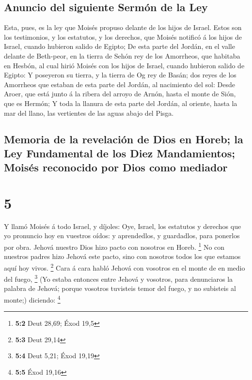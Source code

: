 \hypertarget{anuncio-del-siguiente-sermuxf3n-de-la-ley}{%
\subsection{Anuncio del siguiente Sermón de la
Ley}\label{anuncio-del-siguiente-sermuxf3n-de-la-ley}}

 Esta, pues, es la ley que Moisés propuso delante de los
hijos de Israel.  Estos son los testimonios, y los
estatutos, y los derechos, que Moisés notificó á los hijos de Israel,
cuando hubieron salido de Egipto;  De esta parte del
Jordán, en el valle delante de Beth-peor, en la tierra de Sehón rey de
los Amorrheos, que habitaba en Hesbón, al cual hirió Moisés con los
hijos de Israel, cuando hubieron salido de Egipto:  Y
poseyeron su tierra, y la tierra de Og rey de Basán; dos reyes de los
Amorrheos que estaban de esta parte del Jordán, al nacimiento del sol:
 Desde Aroer, que está junto á la ribera del arroyo de
Arnón, hasta el monte de Sión, que es Hermón;  Y toda la
llanura de esta parte del Jordán, al oriente, hasta la mar del llano,
las vertientes de las aguas abajo del Pisga.

\hypertarget{memoria-de-la-revelaciuxf3n-de-dios-en-horeb-la-ley-fundamental-de-los-diez-mandamientos-moisuxe9s-reconocido-por-dios-como-mediador}{%
\subsection{Memoria de la revelación de Dios en Horeb; la Ley
Fundamental de los Diez Mandamientos; Moisés reconocido por Dios como
mediador}\label{memoria-de-la-revelaciuxf3n-de-dios-en-horeb-la-ley-fundamental-de-los-diez-mandamientos-moisuxe9s-reconocido-por-dios-como-mediador}}

\hypertarget{section-4}{%
\section{5}\label{section-4}}

 Y llamó Moisés á todo Israel, y díjoles: Oye, Israel, los
estatutos y derechos que yo pronuncio hoy en vuestros oídos: y
aprendedlos, y guardadlos, para ponerlos por obra.  Jehová
nuestro Dios hizo pacto con nosotros en Horeb. \footnote{\textbf{5:2}
  Deut 28,69; Éxod 19,5}  No con nuestros padres hizo Jehová
este pacto, sino con nosotros todos los que estamos aquí hoy vivos.
\footnote{\textbf{5:3} Deut 29,14}  Cara á cara habló Jehová
con vosotros en el monte de en medio del fuego, \footnote{\textbf{5:4}
  Deut 5,21; Éxod 19,19}  (Yo estaba entonces entre Jehová y
vosotros, para denunciaros la palabra de Jehová; porque vosotros
tuvisteis temor del fuego, y no subisteis al monte;) diciendo:
\footnote{\textbf{5:5} Éxod 19,16}

